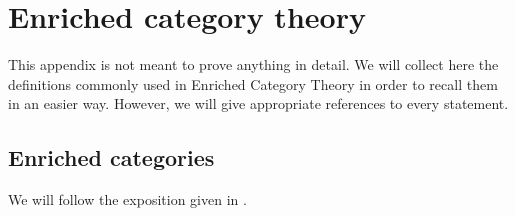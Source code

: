 \chapter{Enriched category theory}

\begin{refsection}

This appendix is not meant to prove anything in detail. We will collect here the definitions commonly used in Enriched Category Theory in order to recall them in an easier way. However, we will give appropriate references to every statement.

\section{Enriched categories}

We will follow the exposition given in \cite{kelly}.


\end{refsection}
